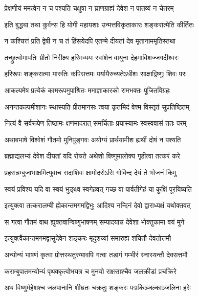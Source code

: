 \twolineshloka
{प्रेक्षणीयं ममत्वेन न च पश्यति चक्षुषा}
{न घ्राणग्राह्यं देवेश न पातव्यं न चेतरम्}%

\twolineshloka
{इति बुद्ध्या तथा कुर्वन्स हि योगी महायशाः}
{उन्मत्तविकृताकारः शङ्करात्मेति कीर्तितः}%

\twolineshloka
{न कश्चित्तं प्रति द्वेषी न च तं हिंसयेदपि}
{एतन्मे दीयतां देव मृतानाममृतिस्तथा}%

\twolineshloka
{तच्छ्रुत्वोमापतिः प्रीतो निरीक्ष्य हरिमव्ययः}
{स्वांशेन वायुना देहमाविशज्जगदीश्वरः}%

\twolineshloka
{हरिरूपः शङ्करात्मा मारुतिः कपिसत्तमः}
{पर्यायैरुच्यतेऽधीशः साक्षाद्विष्णुः शिवः परः}%

\twolineshloka
{आकल्पमेष प्रत्येकं कामरूपमुपाश्रितः}
{ममाज्ञाकारको रामभक्तः पूजितविग्रहः}%

\twolineshloka
{अनन्तकल्पमीशानः स्थास्यति प्रीतमानसः}
{त्वया कृतमिदं वेश्म विस्तृतं सुप्रतिष्ठितम्}%

\twolineshloka
{नित्यं वै सर्वरूपेण तिष्ठामः क्षणमादरात्}
{समर्चिताः प्रयास्यामः स्वस्ववासं ततः परम्}%

\twolineshloka
{अथाबभाषे विश्वेशं गौतमो मुनिपुङ्गवः}
{अयोग्यं प्रार्थयामीश ह्यर्थी दोषं न पश्यति}%

\twolineshloka
{ब्रह्माद्यलभ्यं देवेश दीयतां यदि रोचते}
{अथेशो विष्णुमालोक्य गृहीत्वा तत्करं करे}%

\twolineshloka
{प्रहसन्नम्बुजाभाक्षमित्युवाच सदाशिवः}
{क्षामोदरोऽसि गोविन्द देयं ते भोजनं किमु}%

\twolineshloka
{स्वयं प्रविश्य यदि वा स्वयं भुङ्क्ष्व स्वगेहवत्}
{गच्छ वा पार्वतीगेहं या कुक्षिं पूरयिष्यति}%

\twolineshloka
{इत्युक्त्वा तत्करालम्बी ह्येकान्तमगमद्विभुः}
{आदिश्य नन्दिनं देवो द्वाराध्यक्षं यथोक्तवत्}%

\twolineshloka
{स गत्वा गौतमं वाथ ह्युक्तवान्विष्णुभाषणम्}
{सम्पादयान्नं देवेशा भोक्तुकामा वयं मुने}%

\twolineshloka
{इत्युक्त्वैकान्तमगमद्वासुदेवेन शङ्करः}
{मृदुशय्यां समारुह्य शयितौ देवतोत्तमौ}%

\twolineshloka
{अन्योन्यं भाषणं कृत्वा प्रोत्तस्थतुरुभावपि}
{गत्वा तडागं गम्भीरं स्नास्यन्तौ देवसत्तमौ}%

\twolineshloka
{कराम्बुपातमन्योन्यं पृथक्कृत्वोभयत्र च}
{मुनयो राक्षसाश्चैव जलक्रीडां प्रचक्रिरे}%

\twolineshloka
{अथ विष्णुर्महेशश्च जलपानानि शीघ्रतः}
{चक्रतुः शङ्करः पद्मकिञ्जल्काञ्जलिना हरेः}%

